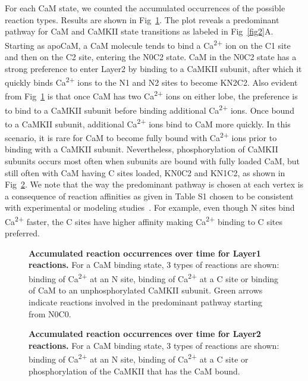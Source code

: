 \documentclass[10pt,letterpaper]{article}
\begin{document}
For each CaM state, we counted the accumulated occurrences of the possible reaction types. Results are shown in Fig~\ref{fig3}. The plot reveals a predominant pathway for CaM and CaMKII state transitions as labeled in Fig~\ref{fig2}A. Starting as apoCaM, a CaM molecule tends to bind a Ca\textsuperscript{2+} ion on the C1 site and then on the C2 site, entering the N0C2 state. CaM in the N0C2 state has a strong preference to enter Layer2 by binding to a CaMKII subunit, after which it quickly binds Ca\textsuperscript{2+} ions to the N1 and N2 sites to become KN2C2. Also evident from Fig~\ref{fig3} is that once CaM has two Ca\textsuperscript{2+} ions on either lobe, the preference is to bind to a CaMKII subunit before binding additional Ca\textsuperscript{2+} ions. Once bound to a CaMKII subunit, additional Ca\textsuperscript{2+} ions bind to CaM more quickly. In this scenario, it is rare for CaM to become fully bound with Ca\textsuperscript{2+} ions prior to binding with a CaMKII subunit. Nevertheless, phosphorylation of CaMKII subunits occurs most often when subunits are bound with fully loaded CaM, but still often with CaM having C sites loaded, KN0C2 and KN1C2, as shown in Fig~\ref{fig4}. We note that the way the predominant pathway is chosen at each vertex is a consequence of reaction affinities as given in Table S1 chosen to be consistent with experimental or modeling studies~\cite{Pepke:2010ju,Zeng:2010bq,Lucic:2008gt}. For example, even though N sites bind Ca\textsuperscript{2+} faster, the C sites have higher affinity making Ca\textsuperscript{2+} binding to C sites preferred. 

\begin{figure}[!h]
	\caption{{\bf Accumulated reaction occurrences over time for Layer1 reactions.}
	For a CaM binding state, 3 types of reactions are shown: binding of Ca\textsuperscript{2+} at an N site, binding of Ca\textsuperscript{2+} at a C site or binding of CaM to an unphosphorylated CaMKII subunit. Green arrows indicate reactions involved in the predominant pathway starting from N0C0.
	}
\label{fig3}
\end{figure}

\begin{figure}[!h]
	\caption{{\bf Accumulated reaction occurrences over time for Layer2 reactions.}
	For a CaM binding state, 3 types of reactions are shown: binding of Ca\textsuperscript{2+} at an N site, binding of Ca\textsuperscript{2+} at a C site or phosphorylation of the CaMKII that has the CaM bound.
	}
\label{fig4}
\end{figure}
\end{document}
